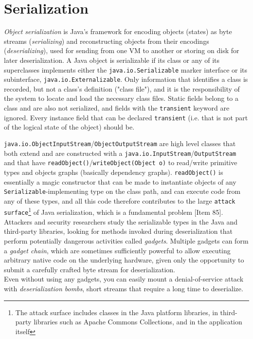 \documentclass[8pt, table, xcdraw]{article}%
\begin{document}
\section{Serialization}

\emph{Object serialization} is Java’s framework for encoding objects (states) as byte streams (\emph{serializing}) and reconstructing objects from their encodings (\emph{deserializing}), used for sending from one VM to another or storing on disk for later deserialization. A Java object is serializable if its class or any of its superclasses implements either the \lstinline{java.io.Serializable} marker interface or its subinterface, \lstinline{java.io.Externalizable}. Only information that identifies a class is recorded, but not a class's definition ("class file"), and it is the responsibility of the system to locate and load the necessary class files. Static fields belong to a class and are also not serialized, and fields with the \lstinline{transient} keyword are ignored. Every instance field that can be declared \lstinline{transient} (i.e. that is not part of the logical state of the object) should be.

\lstinline{java.io.ObjectInputStream}/\lstinline{ObjectOutputStream} are high level classes that both extend and are constructed with a \lstinline{java.io.InputStream}/\lstinline{OutputStream} and that have \lstinline{readObject()}/\lstinline{writeObject(Object o)} to read/write primitive types and objects graphs (basically dependency graphs). \lstinline{readObject()} is essentially a magic constructor that can be made to instantiate objects of any \lstinline{Serializable}-implementing type on the class path, and can execute code from any of these types, and all this code therefore contributes to the large \lstinline{attack surface}\footnote{The attack surface includes classes in the Java platform libraries, in third-party libraries such as Apache Commons Collections, and in the application itself} of Java serialization, which is a fundamental problem [Item 85].\\
Attackers and security researchers study the serializable types in the Java and third-party libraries, looking for methods invoked during deserialization that perform potentially dangerous activities called \emph{gadgets}. Multiple gadgets can form a \emph{gadget
chain}, which are sometimes sufficiently powerful to allow executing arbitrary native code on the underlying hardware,
given only the opportunity to submit a carefully crafted byte stream for deserialization.\\
Even without using any gadgets, you can easily mount a denial-of-service attack with \emph{deserialization bombs}, short streams that require a long time to deserialize.
\end{document}
